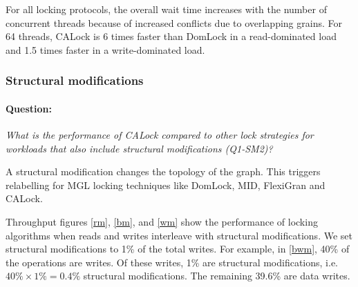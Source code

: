 For all locking protocols, the overall wait time increases with the number of concurrent threads because of increased conflicts due to overlapping grains. For 64 threads, CALock is 6 times faster than DomLock in a read-dominated load and 1.5 times faster in a write-dominated load.


\subsubsection{Structural modifications} \label{benchmark:DynamicOverallPerf}

\paragraph{Question:} \emph{What is the performance of CALock compared to other lock strategies for workloads that also include structural modifications (Q1-SM2)?}

A structural modification changes the topology of the graph. This triggers relabelling for MGL locking techniques like DomLock, MID, FlexiGran and CALock. 

Throughput figures \cref{rm}, \cref{bm}, and \cref{wm} show the performance of locking algorithms when reads and writes interleave with structural modifications.
We set structural modifications to 1\% of the total writes.
For example, in \cref{bwm}, 40\% of the operations are writes. Of these writes, 1\% are structural modifications, i.e. $40\% \times 1\% = 0.4\%$ structural modifications. The remaining 39.6\% are data writes.


